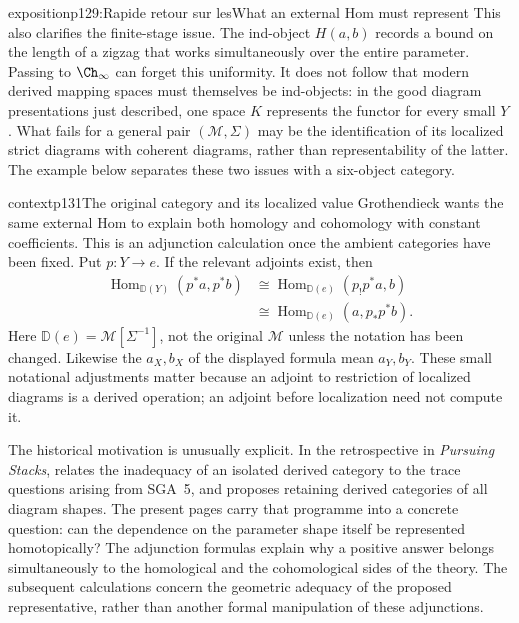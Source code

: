 \begin{dcomment}{exposition}{p129:Rapide retour sur les}{What an external Hom must represent}
This also clarifies the finite-stage issue. The ind-object $H(a,b)$ records a bound on the length of a zigzag that works simultaneously over the entire parameter. Passing to $\Ch_\infty$ can forget this uniformity. It does not follow that modern derived mapping spaces must themselves be ind-objects: in the good diagram presentations just described, one space $K$ represents the functor for every small $Y$. What fails for a general pair $(\mathcal M,\Sigma)$ may be the identification of its localized strict diagrams with coherent diagrams, rather than representability of the latter. The example below separates these two issues with a six-object category.
\end{dcomment}

\begin{dcomment}{context}{p131}{The original category and its localized value}
Grothendieck wants the same external Hom to explain both homology and cohomology with constant coefficients. This is an adjunction calculation once the ambient categories have been fixed. Put $p:Y\to e$. If the relevant adjoints exist, then
\[
\begin{aligned}
 \operatorname{Hom}_{\mathbb D(Y)}(p^*a,p^*b)
 &\cong\operatorname{Hom}_{\mathbb D(e)}(p_!p^*a,b)\\
 &\cong\operatorname{Hom}_{\mathbb D(e)}(a,p_*p^*b).
\end{aligned}
\]
Here $\mathbb D(e)=\mathcal M[\Sigma^{-1}]$, not the original $\mathcal M$ unless the notation has been changed. Likewise the $a_X,b_X$ of the displayed formula mean $a_Y,b_Y$. These small notational adjustments matter because an adjoint to restriction of localized diagrams is a derived operation; an adjoint before localization need not compute it.

The historical motivation is unusually explicit. In the retrospective in \emph{Pursuing Stacks}, \citet[\S69, pp.~1--2]{Grothendieck1983} relates the inadequacy of an isolated derived category to the trace questions arising from SGA~5, and proposes retaining derived categories of all diagram shapes. The present pages carry that programme into a concrete question: can the dependence on the parameter shape itself be represented homotopically? The adjunction formulas explain why a positive answer belongs simultaneously to the homological and the cohomological sides of the theory. The subsequent calculations concern the geometric adequacy of the proposed representative, rather than another formal manipulation of these adjunctions.
\end{dcomment}


